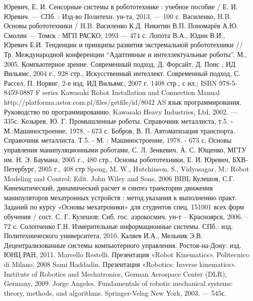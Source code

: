 \documentclass[a4paper,14pt,russian]{extreport} \usepackage{extsizes}
\begin{document}
	\newpage
	\begin{thebibliography}{99}
		Юревич, Е. И. Сенсорные системы в робототехнике : учебное пособие / Е. И. Юревич. — СПб. : Изд-во Политехн. ун-та, 2013. — 100 с.	
		 Василенко, H.B. Основы робототехники / H.B. Василенко К.Д. Никитин В.П. Пономарёв А.Ю. Смолин — Томск : МГП  РАСКО, 1993 — 474 с.			
		 Лопота В.А., Юдин В.И., Юревич Е.И. Тенденции и принципы развития экстремальной робототехники // Тр. Международной конференции “Адаптивные и интеллектуальные роботы”. М., 2005. 
		 Компьютерное зрение. Современный подход, Д. Форсайт, Д. Понс , ИД Вильямс, 2004 г., 928 стр., 
		 Искусственный интеллект. Современный подход, С. Рассел, П. Норвиг, 2-е изд, ИД Вильямс, 2007 г. 1408 стр., с ил.; ISBN 978-5-8459-0887 
		 F series Kawasaki Robot Installation and Connection Manual http://platforma.astor.com.pl/files/getfile/id/8042 
		 AS язык программирования. Руководство по программированию. Kawasaki Heavy Industries, Ltd, 2002. — 335с. 
		 Козырев, Ю. Г. Промышленные роботы. Справочник металлиста, т.5. - М.:Машиностроение, 1978. - 673 с. 
		 Бобров, В. П. Автоматизация транспорта. Справочник металлиста. Т.5. - М. : Машиностроение, 1978. - 673 с. 
		 Основы управления манипуляционными роботами, С. Л. Зенкевич, А. С. Ющенко, МГТУ им. Н. Э. Баумана, 2005 г., 480 стр., 
		  Основы робототехники, Е. И. Юревич, БХВ-Петербург, 2005 г., 408 стр 
		 Spong, M. W., Hutchinson, S., Vidyasagar, M.: Robot Modeling and Control; Edit. John Wiley and Sons, 2006 BIBL 
		 Кулешов, С.Г. Кинематический, динамический расчет и синтез траектории движения манипуляторов мехатронных устройств : метод.указания к выполнению практ. Заданий по курсу «Основы мехатроники» для студентов спец. 151001 всех форм обучения / сост. С. Г. Кулешов; Сиб. гос. аэрокосмич. ун-т – Красноярск, 2006. – 72 с. 
		 Солопченко Г.Н. Измерительные информационные системы. СПб.: изд. Политехнического университета, 2010. 
		 Каляев И.А., Мельник Э.В. Децентрализованные системы компьютерного управления. Ростов-на-Дону: изд. ЮНЦ РАН, 2011. 
		 Marcello Restelli. Презентация «Robot Kinematics». Politecnico di Milano, 2008 
		 Sami Haddadin. Презентация «Robotics: Inverse kinematics». Institute of Robotics and Mechatronics, German Aerospace Center (DLR), Germany, 2009. 
		 Jorge Angeles. Fundamentals of robotic mechanical systems: theory, methods, and algorithms. Springer-Velag New York, 2003. — 545с. 

\end{thebibliography}
\end{document}

